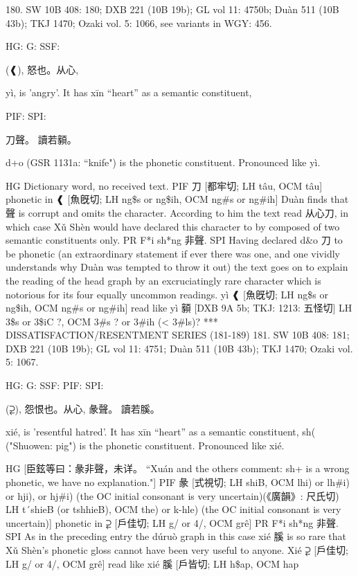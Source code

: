 180. SW 10B 408: 180; DXB 221 (10B 19b); GL vol 11: 4750b; Duàn 511 (10B 43b); TKJ 1470; Ozaki vol. 5: 1066, see
variants in WGY: 456.


HG:
G: SSF:

(❰),
怒也。从心,

yì,
is 'angry'.
It has xīn ``heart'' as a semantic constituent,




PIF: SPI:

刀聲。 讀若顡。

d+o (GSR 1131a: ``knife") is the phonetic constituent. Pronounced like yì.

HG Dictionary word, no received text.
PIF 刀 [都牢切; LH tâu, OCM tâu] phonetic in ❰ [魚旣切; LH ng\$s or ng\$ih, OCM ng\#s or ng\#ih]
    Duàn finds that 聲 is corrupt and omits the character. According to him the text read 从心刀, in which case Xǔ Shèn would have declared this character to by composed of two semantic constituents only.
PR     F*i sh*ng 非聲.
SPI Having declared d&o 刀 to be phonetic (an extraordinary statement if ever there was one, and one vividly understands why Duàn was tempted to throw it out) the text goes on to explain the reading of the head graph by an excruciatingly rare character which is notorious for its four equally uncommon readings.
    yì ❰ [魚旣切; LH ng\$s or ng\$ih, OCM ng\#s or ng\#ih] read like yì 顡 [DXB 9A 5b; TKJ: 1213: 五怪切] LH 3\$s or 3\$iC ?, OCM 3\#s ? or 3\#ih (< 3\#ls)?
                      *** DISSATISFACTION/RESENTMENT SERIES (181-189)
181. SW 10B 408: 181; DXB 221 (10B 19b); GL vol 11: 4751; Duàn 511 (10B 43b); TKJ 1470; Ozaki vol. 5: 1067.


HG:
G: SSF: PIF: SPI:

(⥻),
怨恨也。从心,
彖聲。 讀若膎。

xié,
is 'resentful hatred'.
It has xīn ``heart'' as a semantic constituent,
sh( ("Shuowen: pig") is the phonetic constituent. Pronounced like xié.

HG      [臣鉉等曰：彖非聲，未详。 ``Xuán and the others comment: sh+ is a wrong phonetic, we have no explanation."]
PIF 彖 [式視切; LH shiB, OCM lhi) or lh\#i) or hji), or hj\#i) (the OC initial consonant is very uncertain)(《廣韻》: 尺氏切) LH t´shieB (or tshhieB), OCM the) or k-hle) (the OC initial consonant is very uncertain)] phonetic in ⥻ [戶佳切; LH g/ or 4/, OCM grê]
PR     F*i sh*ng 非聲.
SPI As in the preceding entry the dúruò graph in this case xié 膎 is so rare that Xǔ Shèn's phonetic gloss cannot have been very useful to anyone.
Xié ⥻ [戶佳切; LH g/ or 4/, OCM grê] read like xié 膎 [戶皆切; LH h\$ap, OCM hap



